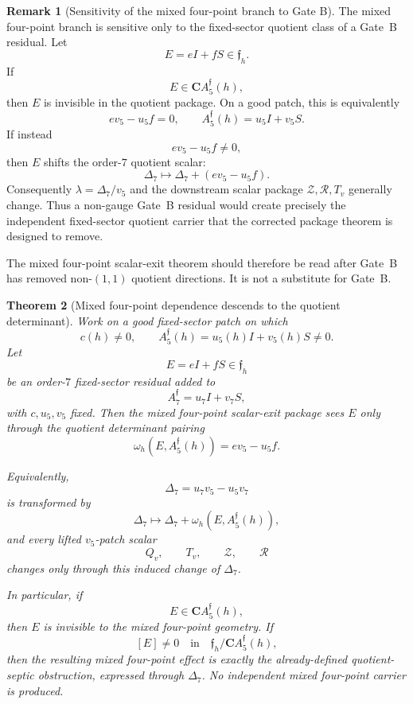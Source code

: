 \documentclass[11pt,a4paper]{amsart}
\theoremstyle{plain}
\newtheorem{theorem}{Theorem}[section]
\theoremstyle{definition}
\newtheorem{remark}[theorem]{Remark}
\begin{document}
\begin{remark}[Sensitivity of the mixed four-point branch to Gate B]
\label{rem:mixed-four-point-sensitivity-to-gate-b}
The mixed four-point branch is sensitive only to the fixed-sector
quotient class of a Gate~B residual.  Let
\[
E=eI+fS\in\mathfrak f_h.
\]
If
\[
E\in \mathbf C A_5^{\mathfrak f}(h),
\]
then \(E\) is invisible in the quotient package.  On a good patch, this
is equivalently
\[
ev_5-u_5f=0,
\qquad
A_5^{\mathfrak f}(h)=u_5I+v_5S.
\]
If instead
\[
ev_5-u_5f\ne0,
\]
then \(E\) shifts the order-\(7\) quotient scalar:
\[
\Delta_7\longmapsto \Delta_7+(ev_5-u_5f).
\]
Consequently \(\lambda=\Delta_7/v_5\) and the downstream scalar package
\(\mathcal Z,\mathcal R,T_v\) generally change.  Thus a non-gauge Gate~B
residual would create precisely the independent fixed-sector quotient
carrier that the corrected package theorem is designed to remove.

The mixed four-point scalar-exit theorem should therefore be read after
Gate~B has removed non-\((1,1)\) quotient directions.  It is not a
substitute for Gate~B.
\end{remark}

\begin{theorem}[Mixed four-point dependence descends to the quotient determinant]
\label{thm:mixed-four-point-dependence-descends-to-quotient-determinant}
Work on a good fixed-sector patch on which
\[
c(h)\ne0,\qquad A_5^{\mathfrak f}(h)=u_5(h)I+v_5(h)S\ne0.
\]
Let
\[
E=eI+fS\in\mathfrak f_h
\]
be an order-\(7\) fixed-sector residual added to
\[
A_7^{\mathfrak f}=u_7I+v_7S,
\]
with \(c,u_5,v_5\) fixed.  Then the mixed four-point scalar-exit package sees
\(E\) only through the quotient determinant pairing
\[
\omega_h(E,A_5^{\mathfrak f}(h))=ev_5-u_5f.
\]

Equivalently,
\[
\Delta_7=u_7v_5-u_5v_7
\]
is transformed by
\[
\Delta_7
\longmapsto
\Delta_7+\omega_h(E,A_5^{\mathfrak f}(h)),
\]
and every lifted \(v_5\)-patch scalar
\[
Q_v,\qquad T_v,\qquad \mathcal Z,\qquad \mathcal R
\]
changes only through this induced change of \(\Delta_7\).

In particular, if
\[
E\in\mathbf C A_5^{\mathfrak f}(h),
\]
then \(E\) is invisible to the mixed four-point geometry.  If
\[
[E]\ne0
\quad\text{in}\quad
\mathfrak f_h/\mathbf C A_5^{\mathfrak f}(h),
\]
then the resulting mixed four-point effect is exactly the already-defined
quotient-septic obstruction, expressed through \(\Delta_7\).  No independent
mixed four-point carrier is produced.
\end{theorem}
\end{document}
